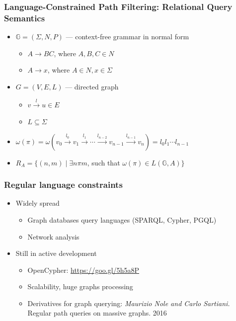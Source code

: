 \documentclass[xcolor=table]{beamer}
\begin{document}
\begin{frame}[fragile]
  \transwipe[direction=90]
  \frametitle{Language-Constrained Path Filtering: Relational Query Semantics}
  \begin{itemize}
    \item $\mathbb{G} = (\Sigma, N, P)$ --- context-free grammar in normal form
    \begin{itemize}
      \item $A \rightarrow B C$, where $A, B, C \in N$
      \item $A \rightarrow x$, where $A \in N, x \in \Sigma$
    \end{itemize}
    \item $G = (V,E,L)$ --- directed graph
      \begin{itemize} 
        \item $v \xrightarrow{l} u \in E$
        \item $L \subseteq \Sigma$
      \end{itemize}
    \item $\omega(\pi) = \omega(v_0 \xrightarrow{l_0} v_1 \xrightarrow{l_1} \cdots \xrightarrow{l_{n-2}} v_{n-1} \xrightarrow{l_{n-1}} v_n) = l_0 l_1 \cdots l_{n-1}$
    \item $R_A = \{ (n, m) \mid \exists n \pi m$, such that $\omega(\pi) \in L(\mathbb{G},A)\}$
  \end{itemize}
\end{frame}

\begin{frame}[fragile]
  \transwipe[direction=90]
  \frametitle{Regular language constraints}
  \begin{itemize}
   \item Widely spread
    \begin{itemize}
      \item Graph databases query languages (SPARQL, Cypher, PGQL)
      \item Network analysis
    \end{itemize}  
    \item Still in active development
    \begin{itemize}
      \item OpenCypher: \url{https://goo.gl/5h5a8P}
      \item Scalability, huge graphs processing
      \item Derivatives for graph querying: \emph{Maurizio Nole and Carlo Sartiani.} Regular path queries on massive graphs. 2016
    \end{itemize}   
  \end{itemize}
\end{frame}
\end{document}
